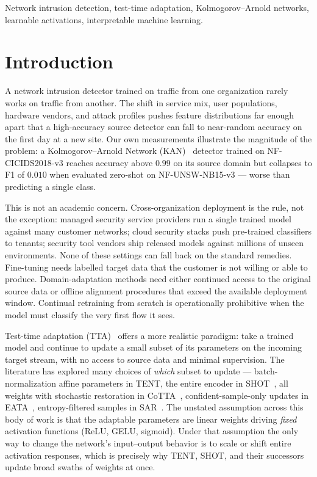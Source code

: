 \documentclass[10pt, conference, letterpaper]{IEEEtran}
\begin{document}
\begin{IEEEkeywords}
Network intrusion detection, test-time adaptation, Kolmogorov--Arnold networks, learnable activations, interpretable machine learning.
\end{IEEEkeywords}


\section{Introduction}
\label{sec:intro}

A network intrusion detector trained on traffic from one organization rarely works on traffic from another. The shift in service mix, user populations, hardware vendors, and attack profiles pushes feature distributions far enough apart that a high-accuracy source detector can fall to near-random accuracy on the first day at a new site. Our own measurements illustrate the magnitude of the problem: a Kolmogorov--Arnold Network (KAN)~\cite{liu2024kan} detector trained on NF-CICIDS2018-v3 reaches accuracy above $0.99$ on its source domain but collapses to F1 of $0.010$ when evaluated zero-shot on NF-UNSW-NB15-v3 --- worse than predicting a single class.

This is not an academic concern. Cross-organization deployment is the rule, not the exception: managed security service providers run a single trained model against many customer networks; cloud security stacks push pre-trained classifiers to tenants; security tool vendors ship released models against millions of unseen environments. None of these settings can fall back on the standard remedies. Fine-tuning needs labelled target data that the customer is not willing or able to produce. Domain-adaptation methods need either continued access to the original source data or offline alignment procedures that exceed the available deployment window. Continual retraining from scratch is operationally prohibitive when the model must classify the very first flow it sees.

Test-time adaptation (TTA)~\cite{wang2021tent} offers a more realistic paradigm: take a trained model and continue to update a small subset of its parameters on the incoming target stream, with no access to source data and minimal supervision. The literature has explored many choices of \emph{which} subset to update --- batch-normalization affine parameters in TENT, the entire encoder in SHOT~\cite{liang2020shot}, all weights with stochastic restoration in CoTTA~\cite{wang2022cotta}, confident-sample-only updates in EATA~\cite{niu2022efficient}, entropy-filtered samples in SAR~\cite{niu2023sar}. The unstated assumption across this body of work is that the adaptable parameters are linear weights driving \emph{fixed} activation functions (ReLU, GELU, sigmoid). Under that assumption the only way to change the network's input--output behavior is to scale or shift entire activation responses, which is precisely why TENT, SHOT, and their successors update broad swaths of weights at once.
\end{document}
